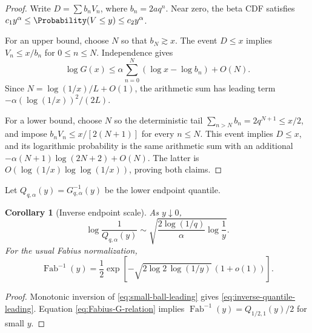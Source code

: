 \documentclass[11pt]{article}
\newtheorem{corollary}[theorem]{Corollary}
\theoremstyle{definition}
\theoremstyle{remark}
\newcommand{\Fab}{\operatorname{Fab}}
\begin{document}
\begin{proof}
Write \(D=\sum b_nV_n\), where \(b_n=2aq^n\).  Near zero, the beta CDF
satisfies \(c_1y^\alpha\le\Probability(V\le y)\le c_2y^\alpha\).

For an upper bound, choose \(N\) so that \(b_N\gtrsim x\).  The event
\(D\le x\) implies \(V_n\le x/b_n\) for \(0\le n\le N\).  Independence gives
\[
 \log G(x)\le\alpha\sum_{n=0}^{N}(\log x-\log b_n)+O(N).
\]
Since \(N=\log(1/x)/L+O(1)\), the arithmetic sum has leading term
\(-\alpha(\log(1/x))^2/(2L)\).

For a lower bound, choose \(N\) so the deterministic tail
\(\sum_{n>N}b_n=2q^{N+1}\le x/2\), and impose
\(b_nV_n\le x/[2(N+1)]\) for every \(n\le N\).  This event implies
\(D\le x\), and its logarithmic probability is the same arithmetic sum with
an additional \(-\alpha(N+1)\log(2N+2)+O(N)\).  The latter is
\(O(\log(1/x)\log\log(1/x))\), proving both claims.
\end{proof}

Let \(Q_{q,\alpha}(y)=G_{q,\alpha}^{-1}(y)\) be the lower endpoint quantile.

\begin{corollary}[Inverse endpoint scale]
\label{cor:inverse-quantile}
As \(y\downarrow0\),
\begin{equation}
 \boxed{
 \log\frac1{Q_{q,\alpha}(y)}
 \sim\sqrt{\frac{2\log(1/q)}{\alpha}\log\frac1y}.}
 \label{eq:inverse-quantile-leading}
\end{equation}
For the usual Fabius normalization,
\begin{equation}
 \Fab^{-1}(y)
 =\frac12\exp\left[-\sqrt{2\log2\,\log(1/y)}\,(1+o(1))\right].
 \label{eq:inverse-Fabius-leading}
\end{equation}
\end{corollary}

\begin{proof}
Monotonic inversion of \eqref{eq:small-ball-leading} gives
\eqref{eq:inverse-quantile-leading}.  Equation
\eqref{eq:Fabius-G-relation} implies
\(\Fab^{-1}(y)=Q_{1/2,1}(y)/2\) for small \(y\).
\end{proof}
\end{document}
